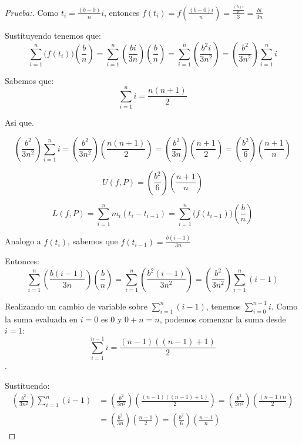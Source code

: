\documentclass[12pt]{article}
\begin{document}
\begin{enumerate}[\hspace{9px} a)]
\begin{proof}[Prueba:]
            Como \(t_i=\displaystyle\frac{(b-0)}{n}i\), entonces \(f(t_i)=f\left(\displaystyle\frac{(b-0)i}{n}\right) = \frac{\frac{(b)i}{n}}{3} = \frac{bi}{3n}\)

            Sustituyendo tenemos que:
            \begin{equation*}
                \sum_{i=1}^n \big(f(t_i)\big)\left(\displaystyle\frac{b}{n}\right) = \sum_{i=1}^n \left(\frac{bi}{3n}\right)\left(\displaystyle\frac{b}{n}\right) = \sum_{i=1}^n \left(\frac{b^2i}{3n^2}\right) = \left(\frac{b^2}{3n^2}\right) \sum_{i=1}^n i
            \end{equation*}

            Sabemos que: \[\sum_{i=1}^n i = \frac{n(n+1)}{2}\]

            Asi que.

            \begin{equation*}
                \left(\frac{b^2}{3n^2}\right) \sum_{i=1}^n i = \left(\frac{b^2}{3n^2}\right)\left(\frac{n(n+1)}{2}\right) = \left(\frac{b^2}{3n}\right)\left(\frac{n+1}{2}\right) =\left(\frac{b^2}{6}\right)\left(\frac{n+1}{n}\right)
            \end{equation*}

            \[U(f,P)=\left(\frac{b^2}{6}\right)\left(\frac{n+1}{n}\right)\]

            \begin{equation*}%
                L(f,P)=\sum_{i=1}^n m_i(t_i-t_{i-1}) = \sum_{i=1}^n \big(f(t_{i-1})\big)\left(\displaystyle\frac{b}{n}\right)
            \end{equation*}

            Analogo a \(f(t_i)\), sabemos que \(f(t_{i-1})=\displaystyle\frac{b(i-1)}{3n}\)\medskip

            Entonces:
            \begin{equation*}
                \sum_{i=1}^n \left(\frac{b(i-1)}{3n}\right)\left(\displaystyle\frac{b}{n}\right) = \sum_{i=1}^n \left(\frac{b^2(i-1)}{3n^2}\right) = \left(\frac{b^2}{3n^2}\right)\sum_{i=1}^n (i-1)
            \end{equation*}

            Realizando un cambio de variable sobre \(\sum_{i=1}^n (i-1)\), tenemos \(\sum_{i=0}^{n-1} i\). Como la suma evaluada en $i=0$ es 0 y \(0+n=n\), podemos comenzar la suma desde \(i=1\): \[\sum_{i=1}^{n-1} i = \displaystyle\frac{(n-1)((n-1)+1)}{2}\].

            Sustituendo:
            \begin{align*}
                \left(\frac{b^2}{3n^2}\right)\sum_{i=1}^n (i-1) &= \left(\frac{b^2}{3n^2}\right)\left(\frac{(n-1)((n-1)+1)}{2}\right) = \left(\frac{b^2}{3n^2}\right)\left(\frac{(n-1)n}{2}\right) \\ &= \left(\frac{b^2}{3n}\right)\left(\frac{n-1}{2}\right) = \left(\frac{b^2}{6}\right)\left(\frac{n-1}{n}\right)
            \end{align*}


\end{proof}
\end{enumerate}
\end{document}
